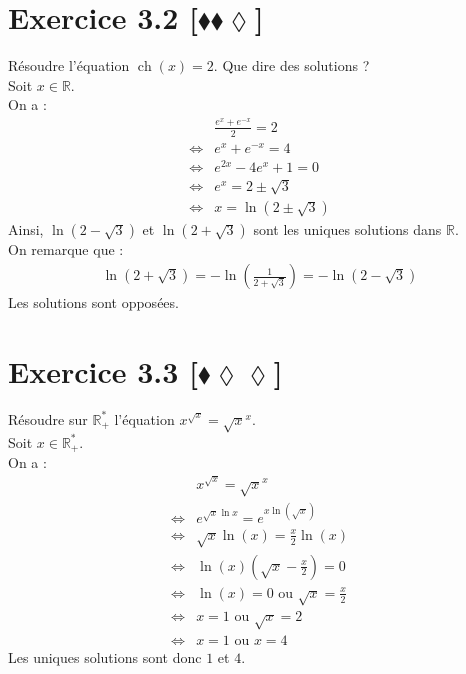 \documentclass[10pt]{article}
\DeclareMathOperator{\ch}{ch}
\begin{document}
\section*{Exercice 3.2 [$\blacklozenge\blacklozenge\lozenge$]}
\begin{tcolorbox}[enhanced, width=6in, center, size=fbox, fontupper=\large, drop shadow southwest]
    Résoudre l'équation $\ch(x)=2$. Que dire des solutions ?\\
    Soit $x\in\mathbb{R}$.\\
    On a :
    \begin{align*}
        &\frac{e^x+e^{-x}}{2}=2\\
        \iff&e^x+e^{-x}=4\\
        \iff&e^{2x}-4e^x+1=0\\
        \iff&e^x=2\pm\sqrt{3}\\
        \iff&x=\ln(2\pm\sqrt{3})
    \end{align*}
    Ainsi, $\ln(2-\sqrt{3})$ et $\ln(2+\sqrt{3})$ sont les uniques solutions dans $\mathbb{R}$.\\
    On remarque que :
    \begin{align*}
        \ln(2+\sqrt{3})=-\ln\left(\frac{1}{2+\sqrt{3}}\right)=-\ln\left(2-\sqrt{3}\right)
    \end{align*}
    Les solutions sont opposées.
\end{tcolorbox}

\section*{Exercice 3.3 [$\blacklozenge\lozenge\lozenge$]}
\begin{tcolorbox}[enhanced, width=6in, center, size=fbox, fontupper=\large, drop shadow southwest]
    Résoudre sur $\mathbb{R}^*_+$ l'équation $x^{\sqrt{x}}=\sqrt{x}^x$.\\
    Soit $x\in\mathbb{R}^*_+$.\\
    On a :
    \begin{align*}
        &x^{\sqrt{x}}=\sqrt{x}^x\\
        \iff&e^{\sqrt{x}\ln{x}}=e^{x\ln(\sqrt{x})}\\
        \iff&\sqrt{x}\ln(x)=\frac{x}{2}\ln(x)\\
        \iff&\ln(x)(\sqrt{x}-\frac{x}{2})=0\\
        \iff&\ln(x)=0\text{ ou } \sqrt{x}=\frac{x}{2}\\
        \iff&x=1\text{ ou }\sqrt{x}=2\\
        \iff&x=1\text{ ou }x=4
    \end{align*}
    Les uniques solutions sont donc $1$ et $4$.
\end{tcolorbox}
\end{document}
